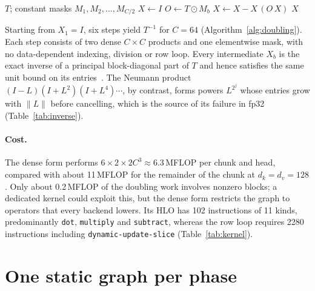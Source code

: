 \documentclass[11pt]{article}
\theoremstyle{remark}
\begin{document}
\begin{algorithm}[t]
\caption{Block-doubling inverse of a unit lower-triangular $T\in\mathbb{R}^{C\times C}$, $C=2^m$.}
\label{alg:doubling}
\begin{algorithmic}[1]
\Require $T$; constant masks $M_1,M_2,\dots,M_{C/2}$
\State $X \gets I$
 
  \State $O \gets T \odot M_b$
  \State $X \gets X - X\,(O\,X)$ 
\EndFor
\State \Return $X$ 
\end{algorithmic}
\end{algorithm}

Starting from $X_1=I$, six steps yield $T^{-1}$ for $C=64$ (Algorithm~\ref{alg:doubling}). Each step consists of two dense
$C\times C$ products and one elementwise mask, with no data-dependent indexing, division or row loop. Every intermediate $X_b$
is the exact inverse of a principal block-diagonal part of $T$ and hence satisfies the same unit bound on its
entries~\cite{sobczyk2026tri}. The Neumann product $(I-L)(I+L^2)(I+L^4)\cdots$, by contrast, forms powers $L^{2^j}$ whose
entries grow with $\lVert L\rVert$ before cancelling, which is the source of its failure in fp32 (Table~\ref{tab:inverse}).

\paragraph{Cost.} The dense form performs $6\times 2\times 2C^3\approx 6.3$\,MFLOP per chunk and head, compared with about
11\,MFLOP for the remainder of the chunk at $d_k=d_v=128$. Only about 0.2\,MFLOP of the doubling work involves nonzero
blocks; a dedicated kernel could exploit this, but the dense form restricts the graph to operators that every backend lowers.
Its HLO has 102 instructions of 11 kinds, predominantly \texttt{dot}, \texttt{multiply} and \texttt{subtract}, whereas the
row loop requires 2280 instructions including \texttt{dynamic-update-slice} (Table~\ref{tab:kernel}).

\section{One static graph per phase}\label{sec:graph}
\end{document}
